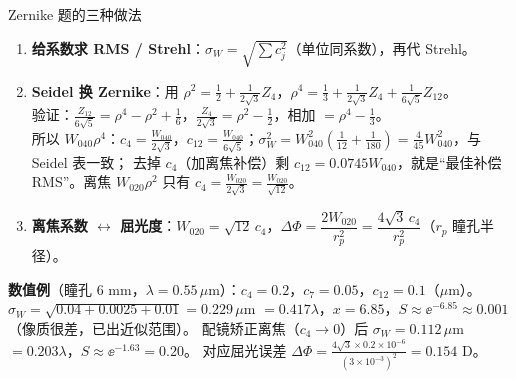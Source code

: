 \begin{recipe}{Zernike 题的三种做法}\label{rc:zernike}
\begin{enumerate}
\item \textbf{给系数求 RMS / Strehl}：$\sigma_W=\sqrt{\sum c_j^2}$（单位同系数），再代 Strehl。
\item \textbf{Seidel 换 Zernike}：用 $\rho^2=\frac12+\frac{1}{2\sqrt3}Z_4$，$\rho^4=\frac13+\frac{1}{2\sqrt3}Z_4+\frac1{6\sqrt5}Z_{12}$。\\
验证：$\frac{Z_{12}}{6\sqrt5}=\rho^4-\rho^2+\frac16$，$\frac{Z_4}{2\sqrt3}=\rho^2-\frac12$，相加 $=\rho^4-\frac13$。\\
所以 $W_{040}\rho^4$：$c_4=\frac{W_{040}}{2\sqrt3}$，$c_{12}=\frac{W_{040}}{6\sqrt5}$；$\sigma_W^2=W_{040}^2(\frac1{12}+\frac1{180})=\frac{4}{45}W_{040}^2$，与 Seidel 表一致；
去掉 $c_4$（加离焦补偿）剩 $c_{12}=0.0745W_{040}$，就是“最佳补偿 RMS”。离焦 $W_{020}\rho^2$ 只有 $c_4=\frac{W_{020}}{2\sqrt3}=\frac{W_{020}}{\sqrt{12}}$。
\item \textbf{离焦系数 $\leftrightarrow$ 屈光度}：$W_{020}=\sqrt{12}\,c_4$，$\Delta\Phi=\dfrac{2W_{020}}{r_p^2}=\dfrac{4\sqrt3\,c_4}{r_p^2}$（$r_p$ 瞳孔半径）。
\end{enumerate}
\textbf{数值例}（瞳孔 6 mm，$\lambda=0.55\,\mu$m）：$c_4=0.2$，$c_7=0.05$，$c_{12}=0.1$（$\mu$m）。
$\sigma_W=\sqrt{0.04+0.0025+0.01}=0.229\,\mu$m $=0.417\lambda$，$x=6.85$，$S\approx\ee^{-6.85}\approx0.001$（像质很差，已出近似范围）。
配镜矫正离焦（$c_4\to0$）后 $\sigma_W=0.112\,\mu$m $=0.203\lambda$，$S\approx\ee^{-1.63}=0.20$。
对应屈光误差 $\Delta\Phi=\frac{4\sqrt3\times0.2\times10^{-6}}{(3\times10^{-3})^2}=0.154$ D。
\end{recipe}

